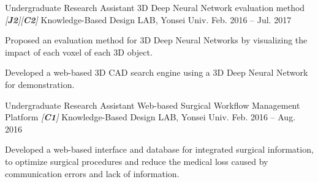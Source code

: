 \begin{cventries}

\cventry
{Undergraduate Research Assistant} %
{3D Deep Neural Network evaluation method \textit{[\textbf{J2}][\textbf{C2}]}} %
{Knowledge-Based Design LAB, Yonsei Univ.} %
{Feb. 2016 – Jul. 2017} %
{ %
\begin{cvitems}
\item {Proposed an evaluation method for 3D Deep Neural Networks by visualizing the impact of each voxel of each 3D object.}
\item {Developed a web-based 3D CAD search engine using a 3D Deep Neural Network for demonstration.}
\end{cvitems}
}

\cventry
{Undergraduate Research Assistant} %
{Web-based Surgical Workflow Management Platform \textit{[\textbf{C1}]}} %
{Knowledge-Based Design LAB, Yonsei Univ.} %
{Feb. 2016 – Aug. 2016} %
{ %
\begin{cvitems}
\item {Developed a web-based interface and database for integrated surgical information, to optimize surgical procedures and reduce the medical loss caused by communication errors and lack of information. }
\end{cvitems}
}

\end{cventries}
